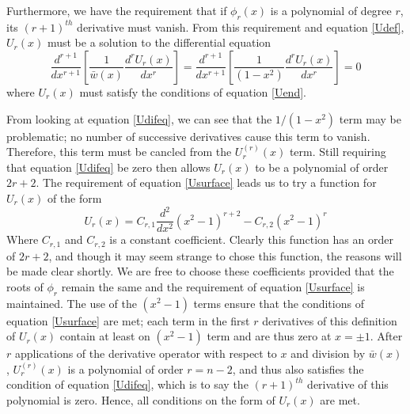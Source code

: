 \documentclass[preprint]{revtex4}
\newcommand{\wbar}{\ensuremath{\bar{w}}}
\begin{document}
Furthermore, we have the requirement that if $\phi_r(x)$ is a polynomial of
degree $r$, its $(r+1)^{th}$ derivative must vanish. From this requirement 
and equation \ref{Udef}, $U_r(x)$ must be a solution to the differential equation
\begin{equation}
\label{Udifeq}
\frac{d^{r+1}}{dx^{r+1}}\left[\frac{1}{\wbar(x)}\frac{d^rU_r(x)}{dx^r}\right]=
\frac{d^{r+1}}{dx^{r+1}}\left[\frac{1}{(1-x^2)}\frac{d^rU_r(x)}{dx^r}\right]=0
\end{equation}
where $U_r(x)$ must satisfy the conditions of equation \ref{Uend}. 

From looking at equation \ref{Udifeq}, we can see that the $1/(1-x^2)$ term may
be problematic; no number of successive derivatives cause this term to vanish. 
Therefore, this term must be cancled from the $U_r^{(r)}(x)$ term. Still requiring 
that equation \ref{Udifeq} be zero then allows $U_r(x)$ to be a polynomial of order
$2r+2$. The requirement of equation \ref{Usurface} leads us to try a function for $U_r(x)$
of the form
\begin{equation}
\label{U1}
U_r(x)=C_{r,1}\frac{d^2}{dx^2}(x^2-1)^{r+2}-C_{r,2}(x^2-1)^r
\end{equation}
Where $C_{r,1}$ and $C_{r,2}$ is a constant coefficient. 
Clearly this function has an order of $2r+2$, and though it may seem strange to chose 
this function, the reasons will be made clear shortly. We are free to choose these
coefficients provided that the roots of $\phi_r$ remain the same and the requirement
of equation \ref{Usurface} is maintained. The use of the $(x^2-1)$ terms ensure that 
the conditions of equation \ref{Usurface} are met; each term in the first $r$ derivatives
of this definition of $U_r(x)$ contain at least on $(x^2-1)$ term and are thus zero at
$x=\pm1$.  After $r$ applications of the derivative operator with respect to $x$ and
division by $\wbar(x)$, 
$U_r^{(r)}(x)$ is a polynomial of order $r=n-2$, and thus also satisfies the condition 
of equation \ref{Udifeq}, which is to say the $(r+1)^{th}$ derivative of this polynomial
is zero. Hence, all conditions on the form of $U_r(x)$ are met. 
\end{document}
